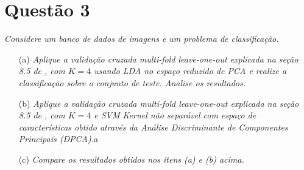 \documentclass[]{abntex2}
\begin{document}
\section*{\textbf{Questão 3}}

\textit{Considere um banco de dados de imagens e um problema de classificação.}

\begin{enumerate}
    \item[(a)] \textit{ Aplique a validação cruzada multi-fold leave-one-out explicada na seção 8.5 de \cite{book}, com $K = 4$ usando LDA no espaço reduzido de PCA e realize a classificação sobre o conjunto de teste. Analise os resultados.}
    
    \item[(b)] \textit{ Aplique a validação cruzada multi-fold leave-one-out explicada na seção 8.5 de \cite{book}, com $K = 4$ e SVM Kernel não separável com espaço de características obtido através da Análise Discriminante de Componentes Principais (DPCA).}a
    
    \item[(c)] \textit{ Compare os resultados obtidos nos itens (a) e (b) acima.}
\end{enumerate}




\end{document}
